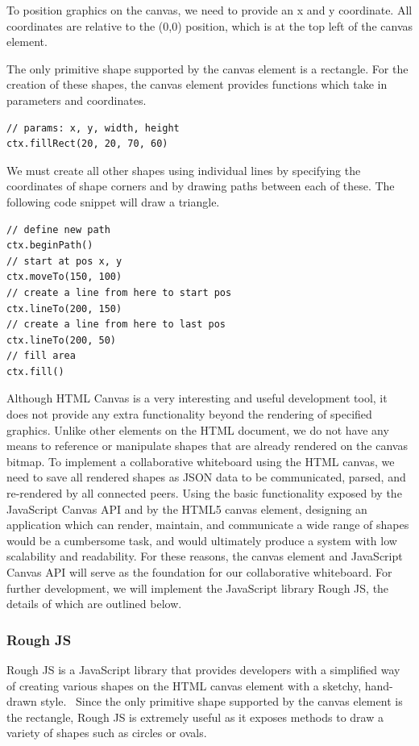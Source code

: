 To position graphics on the canvas, we need to provide an x and y coordinate. All coordinates are relative to the (0,0) position, which is at the top left of the canvas element.  

The only primitive shape supported by the canvas element is a rectangle. For the creation of these shapes, the canvas element provides functions which take in parameters and coordinates.  

\begin{verbatim}
// params: x, y, width, height
ctx.fillRect(20, 20, 70, 60)
\end{verbatim} 

We must create all other shapes using individual lines by specifying the coordinates of shape corners and by drawing paths between each of these. The following code snippet will draw a triangle. 

\begin{verbatim}
// define new path 
ctx.beginPath()
// start at pos x, y
ctx.moveTo(150, 100)
// create a line from here to start pos
ctx.lineTo(200, 150)
// create a line from here to last pos
ctx.lineTo(200, 50)
// fill area
ctx.fill()
\end{verbatim}

Although HTML Canvas is a very interesting and useful development tool, it does not provide any extra functionality beyond the rendering of specified graphics. Unlike other elements on the HTML document, we do not have any means to reference or manipulate shapes that are already rendered on the canvas bitmap. To implement a collaborative whiteboard using the HTML canvas, we need to save all rendered shapes as JSON data to be communicated, parsed, and re-rendered by all connected peers. Using the basic functionality exposed by the JavaScript Canvas API and by the HTML5 canvas element, designing an application which can render, maintain, and communicate a wide range of shapes would be a cumbersome task, and would ultimately produce a system with low scalability and readability. For these reasons, the canvas element and JavaScript Canvas API will serve as the foundation for our collaborative whiteboard. For further development, we will implement the JavaScript library Rough JS, the details of which are outlined below.   

\subsubsection{Rough JS}
\label{roughSection}
Rough JS is a JavaScript library that provides developers with a simplified way of creating various shapes on the HTML canvas element with a sketchy, hand-drawn style.~\cite{shihn2019rough} Since the only primitive shape supported by the canvas element is the rectangle, Rough JS is extremely useful as it exposes methods to draw a variety of shapes such as circles or ovals.

